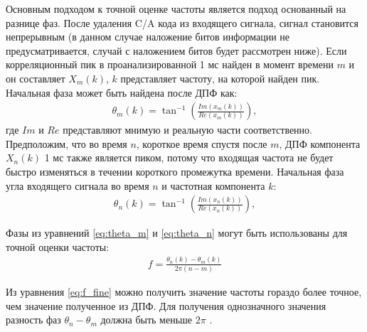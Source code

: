 Основным подходом к точной оценке частоты является подход основанный на разнице фаз. После удаления C/A кода
из входящего сигнала, сигнал становится непрерывным (в данном случае наложение битов информации не предусматривается,
случай с наложением битов будет рассмотрен ниже). Если корреляционный пик в проанализированной 1 мс найден в момент времени ${m}$
и он составляет ${X_m(k)}$, ${k}$ представляет частоту, на которой найден пик. Начальная фаза может быть найдена после ДПФ
как:
\begin{eqnarray}
\theta_m(k) = \tan^{-1}(\frac{Im(x_m(k))}{Re(x_m(k))}),
\label{eq:theta_m}
\end{eqnarray}
где ${Im}$ и ${Re}$ представляют мнимую и реальную части соответственно. Предположим, что во время ${n}$, короткое время спустя после ${m}$,
ДПФ компонента ${X_n(k)}$ 1 мс также является пиком, потому что входящая частота не будет быстро изменяться в течении короткого промежутка 
времени. Начальная фаза угла входящего сигнала во время ${n}$ и частотная компонента ${k}$:
\begin{eqnarray}
\theta_n(k) = \tan^{-1}(\frac{Im(x_n(k))}{Re(x_n(k))}),
\label{eq:theta_n}
\end{eqnarray}

Фазы из уравнений \ref{eq:theta_m} и \ref{eq:theta_n} могут быть использованы для точной оценки частоты:
\begin{eqnarray}
f = \frac{\theta_n(k) - \theta_m(k)}{2\pi(n - m)}
\label{eq:f_fine}
\end{eqnarray}

Из уравнения \ref{eq:f_fine} можно получить значение частоты гораздо более точное, чем значение полученное из ДПФ. Для получения однозначного
значения разность фаз ${\theta_n - \theta_m}$ должна быть меньше ${2\pi}$ \cite{gps}.

